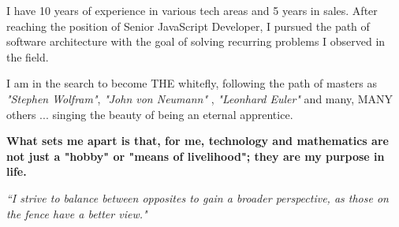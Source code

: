 

\begin{cvparagraph}

\vspace{2mm}

I have 10 years of experience in various tech areas and 5 years in sales. After reaching the position of Senior JavaScript Developer, I pursued the path of software architecture with the goal of solving recurring problems I observed in the field. \par
I am in the search to become THE whitefly, following the path of masters as \textit{"Stephen Wolfram"}, \textit{"John von Neumann"} , \textit{"Leonhard Euler"} and many, MANY others ... singing the beauty of being an eternal apprentice.\par
\textbf{What sets me apart is that, for me, technology and mathematics are not just a "hobby" or "means of livelihood"; they are my purpose in life.}\par
\begin{flushright}
\textit{``I strive to balance between opposites to gain a broader perspective, as those on the fence have a better view."}
\end{flushright}

    
\end{cvparagraph}
